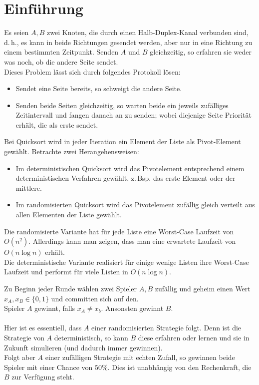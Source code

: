 
\section{Einführung}

Es seien $A,B$ zwei Knoten, die durch einen Halb-Duplex-Kanal verbunden sind, d.\,h., es kann in beide Richtungen gesendet werden, aber nur in eine Richtung zu einem bestimmten Zeitpunkt. Senden $A$ und $B$ gleichzeitig, so erfahren sie weder was noch, ob die andere Seite sendet.\\
Dieses Problem lässt sich durch folgendes Protokoll lösen:
\begin{itemize}
	\item Sendet eine Seite bereits, so schweigt die andere Seite.
	\item Senden beide Seiten gleichzeitig, so warten beide ein jeweils zufälliges Zeitintervall und fangen danach an zu senden; wobei diejenige Seite Priorität erhält, die als erste sendet.
\end{itemize}

Bei Quicksort wird in jeder Iteration ein Element der Liste als Pivot-Element gewählt. Betrachte zwei Herangehensweisen:
\begin{itemize}
	\item Im deterministischen Quicksort wird das Pivotelement entsprechend einem deterministischen Verfahren gewählt, z.\,Bsp. das erste Element oder der mittlere.
	\item Im randomisierten Quicksort wird das Pivotelement zufällig gleich verteilt aus allen Elementen der Liste gewählt.
\end{itemize}
Die randomisierte Variante hat für jede Liste eine Worst-Case Laufzeit von $O(n^2)$. Allerdings kann man zeigen, dass man eine erwartete Laufzeit von $O(n\log n)$ erhält.\\
Die deterministische Variante realisiert für einige wenige Listen ihre Worst-Case Laufzeit und performt für viele Listen in $O(n\log n)$.

Zu Beginn jeder Runde wählen zwei Spieler $A,B$ zufällig und geheim einen Wert $x_A,x_B \in \{0,1\}$ und committen sich auf den.\\
Spieler $A$ gewinnt, falls $x_A\neq x_b$. Ansonsten gewinnt $B$.\\\\
Hier ist es essentiell, dass $A$ einer randomisierten Strategie folgt. Denn ist die Strategie von $A$ deterministisch, so kann $B$ diese erfahren oder lernen und sie in Zukunft simulieren (und dadurch immer gewinnen).\\
Folgt aber $A$ einer zufälligen Strategie mit echten Zufall, so gewinnen beide Spieler mit einer Chance von $50\%$. Dies ist unabhängig von den Rechenkraft, die $B$ zur Verfügung steht.

